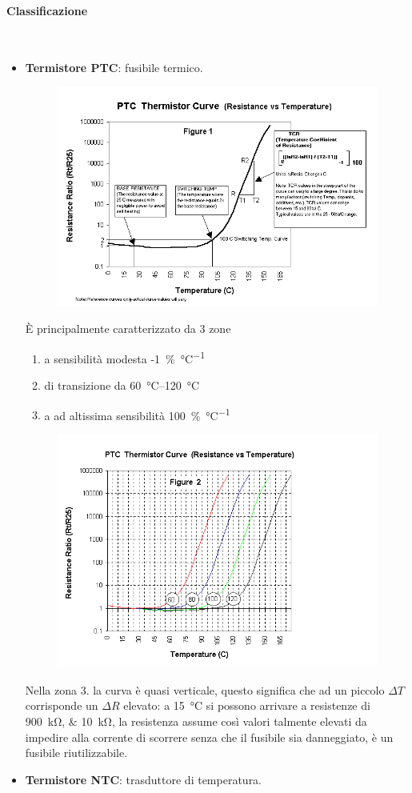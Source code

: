 \documentclass[a4paper, 15pt]{article}
\begin{document}
\begin{adjustwidth}{2in}{}
	\paragraph{Classificazione} \mbox{} \\
	\begin{itemize}
		\item \textbf{Termistore PTC}: fusibile termico. 
		\begin{figure}[H]
			\centering
			\includegraphics[width=0.3\linewidth]{immagini/screenshot015}
			\label{fig:screenshot015}
		\end{figure}
		È principalmente caratterizzato da 3 zone 
		\begin{enumerate}
			\item a sensibilità modesta -\SI{1}{\percent\per\celsius}
			\item di transizione da \SIrange{60}{120}{\celsius}
			\item a ad altissima sensibilità \SI{100}{\percent\per\celsius}
		\end{enumerate}
		\begin{figure}[H]
			\centering
			\includegraphics[width=0.3\linewidth]{immagini/screenshot016}
			\label{fig:screenshot016}
		\end{figure}
		Nella zona $3.$ la curva è quasi verticale, questo significa che ad un piccolo $\Delta T$ corrisponde un $\Delta R$ elevato: a \SI{15}{\celsius} si possono arrivare a resistenze di \SIlist{900;10}{\kilo\ohm}, la resistenza assume così valori talmente elevati da impedire alla corrente di scorrere senza che il fusibile sia danneggiato, è un fusibile riutilizzabile.
		\item \textbf{Termistore NTC}: trasduttore di temperatura. 
		

\end{itemize}
\end{adjustwidth}
\end{document}
